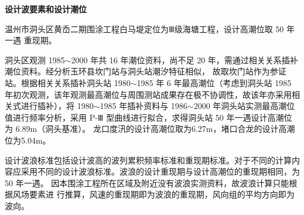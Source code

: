 \documentclass[UTF8, a4paper, 12pt]{ctexart} %
\begin{document}
\begin{table}[h]
    \centering
    \small
    \caption{堤段设计波浪要素表}
    \label{tab:wave_elements}
\end{table}


\par
\textbf{设计波要素和设计潮位}
\par
温州市洞头区黄岙二期围涂工程白马堤定位为Ⅲ级海塘工程，设计高潮位取 50 年一遇
重现期。

洞头区观测 1985$\sim$2000 年共 16 年潮位资料，尚不足 20 年，需通过相关关系插补潮位资料。经分析玉环县坎门站与洞头站潮汐特征相似，
故取坎门站作为参证站。根据相关关系插补洞头站 1980$\sim$1985 年 6 年最高潮位（考虑到洞头站 1985 年初次观测，该年观测最高潮位与周围测站成果存在极不协调性，故该年亦采用相关式进行插补），将 1980$\sim$1985 年插补资料与 1986$\sim$2000 年洞头站实测最高潮位值进行频率分析，采用 P-Ⅲ 型曲线进行拟合，求得洞头站 50 年一遇设计高潮位为 6.89m（洞头基准）。
龙口度汛的设计高潮位取为6.27m，堵口合龙的设计高潮位为5.04m。

设计波浪标准包括设计波高的波列累积频率标准和重现期标准。对于不同的计算内
容应采用不同的设计波浪标准。波浪的设计重现期与设计高潮位的重现期相同，为 50
年一遇。
因本围涂工程所在区域及附近没有波浪实测资料，故波浪计算只能根据风场要素进
行推算，风速的重现期即为波浪的重现期，风向组的平均方向即为波向。
\end{document}

